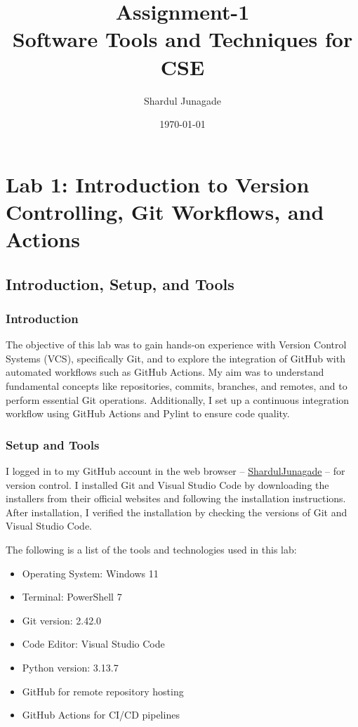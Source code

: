 \documentclass[10pt,a4paper]{report}
\title{\Huge Assignment-1 \\[0.5cm] \LARGE Software Tools and Techniques for CSE}
\author{\Large Shardul Junagade}
\date{\large \today}
\begin{document}
\maketitle
\newpage

\tableofcontents
\newpage


\chapter{Lab 1: Introduction to Version Controlling, Git Workflows, and Actions}


\section{Introduction, Setup, and Tools}

\subsection{Introduction}
The objective of this lab was to gain hands-on experience with Version Control Systems (VCS), specifically Git, and to explore the integration of GitHub with automated workflows such as GitHub Actions. My aim was to understand fundamental concepts like repositories, commits, branches, and remotes, and to perform essential Git operations. Additionally, I set up a continuous integration workflow using GitHub Actions and Pylint to ensure code quality.

\subsection{Setup and Tools}
I logged in to my GitHub account in the web browser -- \href{https://github.com/ShardulJunagade}{ShardulJunagade} -- for version control. I installed Git and Visual Studio Code by downloading the installers from their official websites and following the installation instructions. After installation, I verified the installation by checking the versions of Git and Visual Studio Code.

\begingroup
The following is a list of the tools and technologies used in this lab:
\begin{itemize}[itemsep=0.05em, topsep=0pt]
    \item Operating System: Windows 11
    \item Terminal: PowerShell 7
    \item Git version: 2.42.0
    \item Code Editor: Visual Studio Code
    \item Python version: 3.13.7
    \item GitHub for remote repository hosting
    \item GitHub Actions for CI/CD pipelines
\end{itemize}
\endgroup
\end{document}
